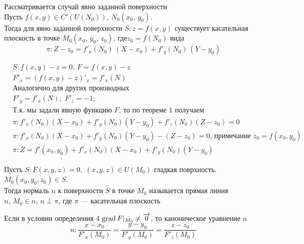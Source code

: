 		\begin{Th}
            Рассматривается случай явно заданной поверхности\\
			Пусть $f(x, y) \in C'(U(N_0)), \, N_0(x_0,\, y_0)$.\\
			Тогда для явно заданной поверхности $S : z = f(x, y)$ существует касательная плоскость в точке $M_0(x_0,\, y_0,\, z_0), \, \text{где} z_0 = f(N_0)$ вида 
			\[\pi: Z-z_0 = f'_x(N_0)\,(X-x_0) + f'_y(N_0)\,(Y-y_0)\]
		\end{Th}
		\begin{Proof}
			\begin{align*}
				&S: f(x, y) - z = 0, \, F = f(x, y) - z\\
				&F'_x = (f(x, y) - z)'_x = f'_x(N) \\ 
				&\text{Аналогично для других производных}\\
				&F'_y = f'_x(N); \; F'_z = -1;\\
				&\text{Т.к. мы задали явную функцию $F$, то по теореме 1 получаем}\\
				&\pi : f'_x(N_0)(X-x_0) + f'_y(N_0)(Y-y_0) + f'_z(N_0)(Z-z_0) = 0 \\
				&\pi : f'_x(N_0)(X-x_0) + f'_y(N_0)(Y-y_0) - (Z-z_0) = 0 ,\, \text{примечание } z_0 = f(x_0, y_0)\\
				&\pi : Z = f'(x_0, y_0) + f'_x(N_0)(X-x_0) + f'_y(N_0)(Y-y_0)
			\end{align*}
		\end{Proof}
		
		\begin{Def}
			Пусть $S : F(x,y,z) = 0, \; (x, y, z) \in U(M_0)$ гладкая поврхность. $M_0(x_0, y_0, z_0) \in S$.\\
			Тогда нормаль $n$ к поверхности $S$ в точке $M_0$ называется прямая линия $n,\, M_0 \in n,\, n\perp\pi$, где $\pi$ --- касательная плоскость
		\end{Def}
		
		\begin{Note}
			Если в условии определения 4 $ \mathop{\mathrm{grad}} F |_{M_0} \neq \overrightarrow{0}$, то каноническое уравнение $n$
			\[
				n : \frac{x - x_0}{F'_x(M_0)} = \frac{y - y_0}{F'_y(M_0)} = \frac{z - z_0}{F'_z(M_0)}
			\] 
		\end{Note}
		